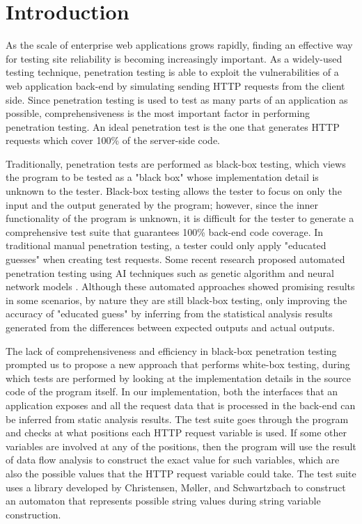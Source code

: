 \chapter{Introduction}

As the scale of enterprise web applications grows rapidly, finding an effective way for testing site reliability is becoming increasingly important. As a widely-used testing technique, penetration testing is able to exploit the vulnerabilities of a web application back-end by simulating sending HTTP requests from the client side. Since penetration testing is used to test as many parts of an application as possible, comprehensiveness is the most important factor in performing penetration testing. An ideal penetration test is the one that generates HTTP requests which cover 100\% of the server-side code.

Traditionally, penetration tests are performed as black-box testing, which views the program to be tested as a "black box" whose implementation detail is unknown to the tester. Black-box testing allows the tester to focus on only the input and the output generated by the program; however, since the inner functionality of the program is unknown, it is difficult for the tester to generate a comprehensive test suite that guarantees 100\% back-end code coverage. In traditional manual penetration testing, a tester could only apply "educated guesses" when creating test requests. Some recent research proposed automated penetration testing using AI techniques such as genetic algorithm \cite{ref1} and neural network models \cite{ref2}. Although these automated approaches showed promising results in some scenarios, by nature they are still black-box testing, only improving the accuracy of "educated guess" by inferring from the statistical analysis results generated from the differences between expected outputs and actual outputs.

The lack of comprehensiveness and efficiency in black-box penetration testing prompted us to propose a new approach that performs white-box testing, during which tests are performed by looking at the implementation details in the source code of the program itself. In our implementation, both the interfaces that an application exposes and all the request data that is processed in the back-end can be inferred from static analysis results. The test suite goes through the program and checks at what positions each HTTP request variable is used. If some other variables are involved at any of the positions, then the program will use the result of data flow analysis to construct the exact value for such variables, which are also the possible values that the HTTP request variable could take. The test suite uses a library developed by Christensen, Møller, and Schwartzbach \cite{ref4} to construct an automaton that represents possible string values during string variable construction.

